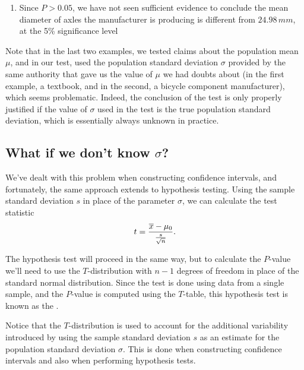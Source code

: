 \begin{example}
\begin{enumerate}[label=\textnormal{\Roman*}.]
\begin{center}
\end{center}
Thus, the P-value is $P(Z \geq 1.48) + P(Z \leq -1.48) = 2\,P(Z \leq -1.48) = 0.1388$.

\item Since $P > 0.05$, we have not seen sufficient evidence to conclude the mean diameter of axles the manufacturer is producing is different from $24.98\,mm$, at the 5\% significance level
\end{enumerate}
\end{example}

Note that in the last two examples, we tested claims about the population mean $\mu$, and in our test, used the population standard deviation $\sigma$ provided by the same authority that gave us the value of $\mu$ we had doubts about (in the first example, a textbook, and in the second, a bicycle component manufacturer), which seems problematic. Indeed, the conclusion of the test is only properly justified if the value of $\sigma$ used in the test is the true population standard deviation, which is essentially always unknown in practice.

\subsection*{What if we don't know $\sigma$?}

We've dealt with this problem when constructing confidence intervals, and fortunately, the same approach extends to hypothesis testing. Using the sample standard deviation $s$ in place of the parameter $\sigma$, we can calculate the test statistic
$$t = \frac{{\overline{x}} - \mu_{0}}{\frac{s}{\sqrt{n}}}.$$

The hypothesis test will proceed in the same way, but to calculate the $P$-value we'll need to use the $T$-distribution with $n-1$ degrees of freedom in place of the standard normal distribution. Since the test is done using data from a single sample, and the $P$-value is computed using the $T$-table, this hypothesis test is known as the .

\begin{remark}
Notice that the $T$-distribution is used to account for the additional variability introduced by using the sample standard deviation $s$ as an estimate for the population standard deviation $\sigma$. This is done when constructing confidence intervals and also when performing hypothesis tests.
\end{remark}

